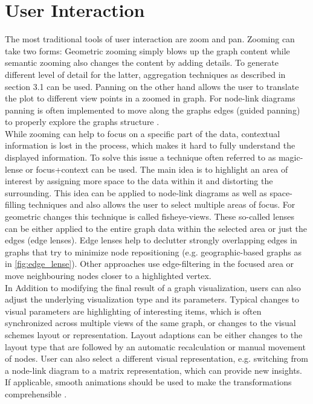 \section{User Interaction}
The most traditional tools of user interaction are zoom and pan. Zooming can take two forms: Geometric zooming simply blows up the graph content while semantic zooming also changes the content by adding details\cite{Herman2000}. To generate different level of detail for the latter, aggregation techniques as described in section 3.1 can be used. Panning on the other hand allows the user to translate the plot to different view points in a zoomed in graph. For node-link diagrams panning is often implemented to move along the graphs edges (guided panning) to properly explore the graphs structure \cite{VonLandesberger2011}.\\ 
While zooming can help to focus on a specific part of the data, contextual information is lost in the process, which makes it hard to fully understand the displayed information. To solve this issue a technique often referred to as magic-lense or focus+context can be used. The main idea is to highlight an area of interest by assigning more space to the data within it and distorting the surrounding. This idea can be applied to node-link diagrams as well as space-filling techniques and also allows the user to select multiple areas of focus. For geometric changes this technique is called fisheye-views. These so-called lenses can be either applied to the entire graph data within the selected area or just the edges (edge lenses). Edge lenses help to declutter strongly overlapping edges in graphs that try to minimize node repositioning (e.g. geographic-based graphs as in \autoref{fig:edge_lense}). Other approaches use edge-filtering in the focused area or move neighbouring nodes closer to a highlighted vertex.\\
In Addition to modifying the final result of a graph visualization, users can also adjust the underlying visualization type and its parameters. Typical changes to visual parameters are highlighting of interesting items, which is often synchronized across multiple views of the same graph, or changes to the visual schemes layout or representation. Layout adaptions can be either changes to the layout type that are followed by an automatic recalculation or manual movement of nodes. User can also select a different visual representation, e.g. switching from a node-link diagram to a matrix representation, which can provide new insights. If applicable, smooth animations should be used to make the transformations comprehensible \cite{VonLandesberger2011}.


